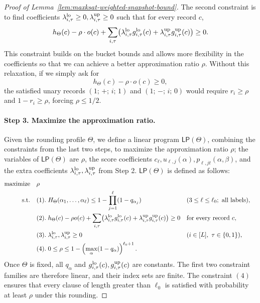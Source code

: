 \begin{proof}[Proof of Lemma~\ref{lem:maxksat-weighted-snapshot-bound}]
\medskip
The second constraint is to   find    coefficients $\lambda^{\rm lo}_{i,\tau}\ge 0,\lambda^{\rm up}_{i,\tau}\ge 0$ such that for   every record $c$,
\begin{equation}
  h_\Theta(c)-\rho\cdot  o(c)
  +\sum_{i,\tau}\bigl(
    \lambda^{\rm lo}_{i,\tau}g^{\rm lo}_{i,\tau}(c)
    +\lambda^{\rm up}_{i,\tau}g^{\rm up}_{i,\tau}(c)\bigr)\ge0.
  \label{eq:snapshot-record-lower}
\end{equation}
This constraint  builds on the bucket bounds and allows more flexibility in the coefficients so that we can achieve a better approximation ratio $\rho$. Without this  relaxation,  if  we simply ask for   
\[
 h_\Theta(c)-\rho\cdot  o(c)\ge 0,
\] the satisfied unary records $(1;\,+;\,i;\,1)$ and $(1;\,-;\,i;\,0)$ would require $r_i\ge\rho$ and $1-r_i\ge\rho$, forcing $\rho\le1/2$.

\paragraph{Step 3. Maximize the approximation ratio.}
Given the rounding profile  $\Theta$, we define a linear program $\mathsf{LP}(\Theta)$, combining the constraints from the last two steps, to maximize the approximation ratio $\rho$; the variables of $\mathsf{LP}(\Theta)$ are $\rho$, the score coefficients $c_\ell,u_{\ell,j}(\alpha),p_{\ell,jt}(\alpha,\beta)$, and the extra  coefficients $\lambda^{\rm lo}_{i,\tau},\lambda^{\rm up}_{i,\tau}$ from Step 2.  
$\mathsf{LP}(\Theta)$ is defined as follows: 
\[
\begin{aligned}
  \text{maximize}\quad &\rho\\
  \text{s.t.}\quad
  & (1).\;H_\Theta(\alpha_1,\ldots,\alpha_\ell)
    \le1-\prod_{j=1}^\ell(1-q_{\alpha_j})
    &&(3\le\ell\le\ell_0;\text{ all labels}),\\
  &(2).\; h_\Theta(c)-\rho o(c)
    +\sum_{i,\tau}\bigl(\lambda^{\rm lo}_{i,\tau}g^{\rm lo}_{i,\tau}(c)
    +\lambda^{\rm up}_{i,\tau}g^{\rm up}_{i,\tau}(c)\bigr)\ge0
    &&\text{for every record }c,\\
  &(3).\; \lambda^{\rm lo}_{i,\tau},\lambda^{\rm up}_{i,\tau}\ge0
    &&(i\in[L],\ \tau\in\{0,1\}),\\
  &(4).\; 0\le\rho\le 1-\left(\max_\alpha(1-q_\alpha)\right)^{\ell_0+1}.
\end{aligned}
\]
Once $\Theta$ is fixed, all $q_\alpha$ and $g^{\rm lo}_{i,\tau}(c),g^{\rm up}_{i,\tau}(c)$ are constants. The first two constraint families are therefore linear, and their index sets are finite. The constraint $(4)$ ensures that every clause of length greater than $\ell_0$ is satisfied with probability at least $\rho$ under this rounding.


\end{proof}
